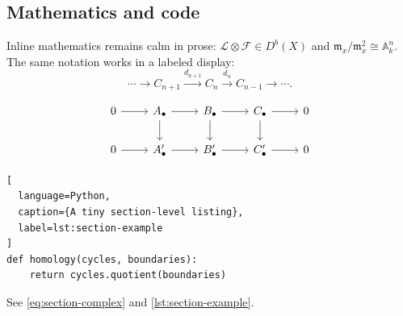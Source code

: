 \documentclass[sectionlevel=section,status=draft]{noteformyself}
\begin{document}
\subsection[
  tag=0SE0203,
  label=\labelNFM{subsec:section-features}
]{Mathematics and code}

Inline mathematics remains calm in prose:
\(\mathcal{L}\otimes\mathscr{F}\in D^b(X)\) and
\(\mathfrak{m}_x/\mathfrak{m}_x^2\cong\mathbb{A}^n_k\).
The same notation works in a labeled display:
\begin{equation}\label{eq:section-complex}
  \cdots \longrightarrow C_{n+1}
  \xrightarrow{d_{n+1}} C_n
  \xrightarrow{d_n} C_{n-1}
  \longrightarrow \cdots .
\end{equation}

\[
\begin{tikzcd}
  0 \arrow[r] & A_\bullet \arrow[r] \arrow[d]
    & B_\bullet \arrow[r] \arrow[d]
    & C_\bullet \arrow[r] \arrow[d] & 0 \\
  0 \arrow[r] & A'_\bullet \arrow[r]
    & B'_\bullet \arrow[r]
    & C'_\bullet \arrow[r] & 0
\end{tikzcd}
\]

\begin{lstlisting}[
  language=Python,
  caption={A tiny section-level listing},
  label=lst:section-example
]
def homology(cycles, boundaries):
    return cycles.quotient(boundaries)
\end{lstlisting}

See \cref{eq:section-complex} and \cref{lst:section-example}.
\end{document}
